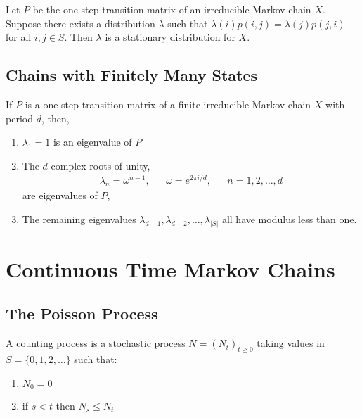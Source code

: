 \documentclass[12pt]{article}
\begin{document}
\begin{theorem}
Let \( P \) be the one-step transition matrix of an irreducible Markov chain \( X \). Suppose there exists a distribution \( \lambda \) such that \( \lambda(i) p(i,j) = \lambda(j) p(j,i) \) for all \( i,j\in S \). Then \( \lambda \) is a stationary distribution for \( X \).
\end{theorem}

\subsection{Chains with Finitely Many States}
\begin{theorem}
If \( P \) is a one-step transition matrix of a finite irreducible Markov chain \( X \) with period \( d \), then,
\begin{enumerate}[nolistsep]
    \item \( \lambda_1 = 1 \) is an eigenvalue of \( P \)
    \item The \( d \) complex roots of unity,
    \begin{align*}
        \lambda_n = \omega^{n-1}, && \omega = e^{2\pi i/d}, && n=1,2,\ldots, d
    \end{align*}
    are eigenvalues of \( P \),
    \item The remaining eigenvalues \( \lambda_{d+1}, \lambda_{d+2}, \ldots, \lambda_{|S|} \) all have modulus less than one.
\end{enumerate}
\end{theorem}


\section{Continuous Time Markov Chains}
\subsection{The Poisson Process}

\begin{definition}
A counting process is a stochastic process \( N = (N_t)_{t\geq 0} \) taking values in \( S = \{0,1,2,\ldots\} \) such that:
\begin{enumerate}[nolistsep]
    \item \( N_0 = 0 \)
    \item if \( s<t \) then \( N_s\leq N_t \)
\end{enumerate}
\end{definition}
\end{document}
